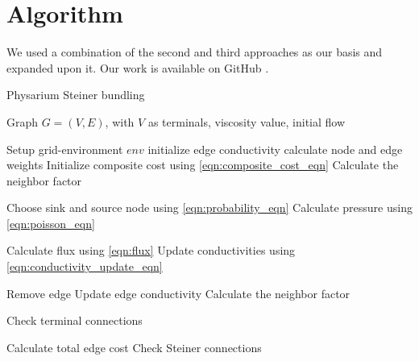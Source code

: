 \section{Algorithm}
\label{sec:alogrithm}
We used a combination of the second and third approaches as our basis and expanded upon it. Our work is available on GitHub \cite{algortihm}.

\begin{algorithm}
\caption{Physarium Steiner bundling}\label{psb_algorithm}
    \begin{algorithmic}
        \Require Graph $G = (V,E)$, with $V$ as terminals, viscosity value, initial flow
        
            \State Setup grid-environment $env$
            \State initialize edge conductivity
            \State calculate node and edge weights
                    \State Initialize composite cost using \autoref{eqn:composite_cost_eqn}
                    \State Calculate the neighbor factor
                \EndFor
            
                    \State Choose sink and source node using \autoref{eqn:probability_eqn}
                    \State Calculate pressure using \autoref{eqn:poisson_eqn}
        
                        \State Calculate flux using \autoref{eqn:flux}
                        \State Update conductivities using \autoref{eqn:conductivity_update_eqn}
        
                            \State Remove edge
                        \Else
                            \State Update edge conductivity
                            \State Calculate the neighbor factor
                        \EndIf
                    \EndFor
        
                            \State Check terminal connections
                        \EndFor
        
                            \State Calculate total edge cost
                            \State Check Steiner connections
                        \EndFor
                    \EndIf
                

\end{algorithmic}
\end{algorithm}
